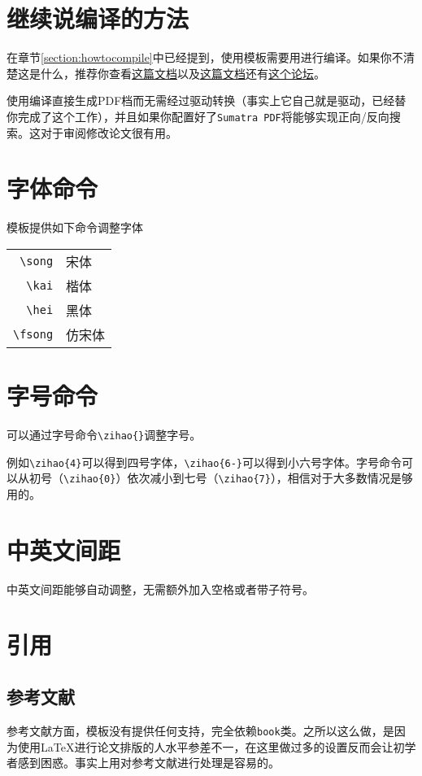 \section{继续说编译的方法}
在章节\ref{section:howtocompile}中已经提到，使用模板需要用\XeLaTeX{}进行编译。如果你不清楚这是什么，推荐你查看\href{ http://blog.renren.com/blog/bp/Q74DZitxxv}{这篇文档}以及\href{http://blog.renren.com/blog/bp/Q7LjRQLBcl}{这篇文档}还有\href{http://bbs.ctex.org/forum.php}{这个论坛}。

使用\XeLaTeX{}编译直接生成PDF档而无需经过驱动转换（事实上它自己就是驱动，已经替你完成了这个工作），并且如果你配置好了\texttt{Sumatra PDF}将能够实现正向/反向搜索。这对于审阅修改论文很有用。
\section{字体命令}
模板提供如下命令调整字体
\begin{center}
\begin{tabular}
{rl}
\toprule
\verb|\song|& 宋体\\
\verb|\kai|& 楷体\\
\verb|\hei|& 黑体\\
\verb|\fsong|& 仿宋体\\
\bottomrule
\end{tabular}
\end{center}
\section{字号命令}
可以通过字号命令\verb|\zihao{}|调整字号。

例如\verb|\zihao{4}|可以得到四号字体，\verb|\zihao{6-}|可以得到小六号字体。字号命令可以从初号（\verb|\zihao{0}|）依次减小到七号（\verb|\zihao{7}|），相信对于大多数情况是够用的。
\section{中英文间距}
中英文间距能够自动调整，无需额外加入空格或者带子符号。
\section{引用}
\subsection{参考文献}
参考文献方面，模板没有提供任何支持，完全依赖\texttt{book}类。之所以这么做，是因为使用\LaTeX{}进行论文排版的人水平参差不一，在这里做过多的设置反而会让初学者感到困惑。事实上用\BibTeX{}对参考文献进行处理是容易的。
